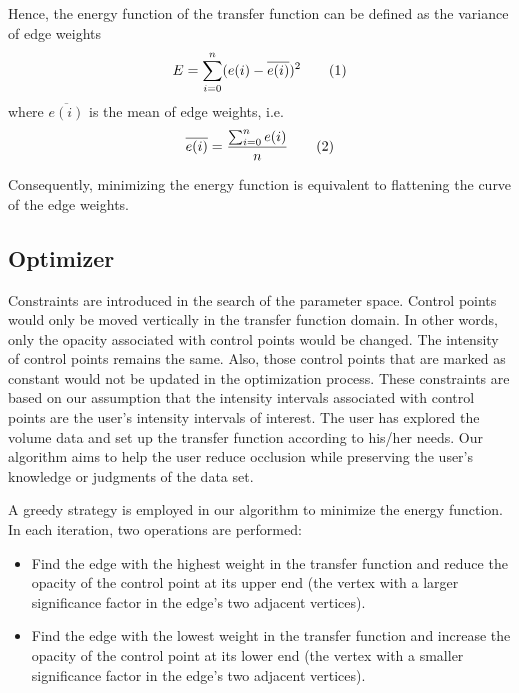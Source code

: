 Hence, the energy function of the transfer function can be defined as the variance of edge weights
\[
E=\sum_{i=0}^{n}(e(i)-\overline{e(i)})^{2}
\addtag \]
where $ \overline{e(i)} $ is the mean of edge weights, i.e.
\[
\overline{e(i)}= \frac{\sum_{i=0}^{n}e(i)}{n}
\addtag \]
%

Consequently, minimizing the energy function is equivalent to flattening the curve of the edge weights.

\subsection{Optimizer \label{optimizer}}
\label{sec:optimizer}
Constraints are introduced in the search of the parameter space. Control points would only be moved vertically in the transfer function domain. In other words, only the opacity associated with control points would be changed. The intensity of control points remains the same. Also, those control points that are marked as constant would not be updated in the optimization process.
These constraints are based on our assumption that the intensity intervals associated with control points are the user's intensity intervals of interest. The user has explored the volume data and set up the transfer function according to his/her needs. Our algorithm aims to help the user reduce occlusion while preserving the user's knowledge or judgments of the data set.

A greedy strategy is employed in our algorithm to minimize the energy function. In each iteration, two operations are performed:
\begin{itemize}
\item Find the edge with the highest weight in the transfer function and reduce the opacity of the control point at its upper end (the vertex with a larger significance factor in the edge's two adjacent vertices).
\item Find the edge with the lowest weight in the transfer function and increase the opacity of the control point at its lower end (the vertex with a smaller significance factor in the edge's two adjacent vertices).
\end{itemize}

